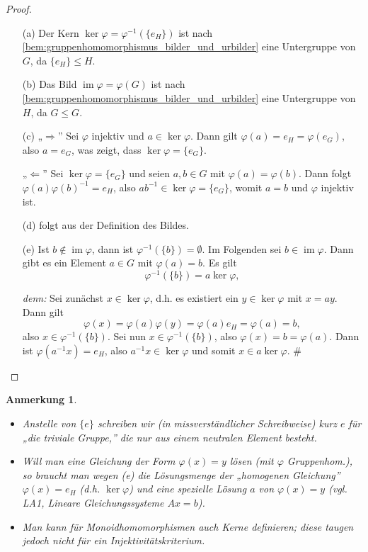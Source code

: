 \documentclass[a4paper, twoside, 11pt, ngerman]{report}
\DeclareMathOperator{\image}{im}
\theoremstyle{definistyle}
\newtheorem{anm}[satz]{Anmerkung}
\theoremstyle{remark}
\newenvironment{denn}%
  {\par\textit{denn:}}%
  {\hfill\#\par}
\begin{document}
\begin{proof}
\begin{itemize}
    \item[(a)] Der Kern $\ker \varphi = \varphi^{-1}(\{e_H\})$ ist nach \ref{bem:gruppenhomomorphismus_bilder_und_urbilder} eine Untergruppe von $G$, da $\{e_H\} \leq H$.
    
    \item[(b)] Das Bild $\image \varphi = \varphi(G)$ ist nach \ref{bem:gruppenhomomorphismus_bilder_und_urbilder} eine Untergruppe von $H$, da $G \leq G$.
    
    \item[(c)] „$\Rightarrow$” Sei $\varphi$ injektiv und $a \in \ker \varphi$. Dann gilt $\varphi(a) = e_H = \varphi(e_G)$, also $a = e_G$, was zeigt, dass $\ker \varphi = \{e_G\}$.

    „$\Leftarrow$” Sei $\ker \varphi = \{e_G\}$ und seien $a, b \in G$ mit $\varphi(a) = \varphi(b)$. Dann folgt $\varphi(a)\varphi(b)^{-1} = e_H$, also $ab^{-1} \in \ker \varphi = \{e_G\}$, womit $a = b$ und $\varphi$ injektiv ist.

    \item[(d)] folgt aus der Definition des Bildes.

    \item[(e)] Ist $b \notin \image \varphi$, dann ist $\varphi^{-1}(\{b\}) = \emptyset$.
Im Folgenden sei $b \in \image \varphi$. Dann gibt es ein Element $a \in G$ mit $\varphi(a) = b$. Es gilt
    \[
    \varphi^{-1}(\{b\}) = a \ker \varphi,
    \]
    \begin{denn}
    Sei zunächst $x \in \ker \varphi$, d.h. es existiert ein $y \in \ker \varphi$ mit $x = ay$. Dann gilt \[\varphi(x) = \varphi(a)\varphi(y) = \varphi(a)e_H = \varphi(a) = b,\]
    also $x \in \varphi^{-1}(\{b\})$.
    Sei nun $x \in \varphi^{-1}(\{b\})$, also $\varphi(x) = b = \varphi(a)$. Dann ist $\varphi(a^{-1} x) = e_H$, also $a^{-1} x \in \ker \varphi$ und somit $x \in a \ker \varphi$.
    \end{denn}
\end{itemize}
\end{proof}

\begin{anm}\label{anm:triviale_gruppe_schreibweise}
\begin{itemize}
    \item Anstelle von $\{e\}$ schreiben wir (in missverständlicher Schreibweise) kurz $e$ für „die triviale Gruppe,” die nur aus einem neutralen Element besteht.
    
    \item Will man eine Gleichung der Form $\varphi(x) = y$ lösen (mit $\varphi$ Gruppenhom.), so braucht man wegen (e) die Lösungsmenge der „homogenen Gleichung” $\varphi(x) = e_H$ (d.h. $\ker \varphi$) und eine spezielle Lösung $a$ von $\varphi(x) = y$ (vgl. LA1, Lineare Gleichungssysteme $Ax = b$).
    
    \item Man kann für Monoidhomomorphismen auch Kerne definieren; diese taugen jedoch nicht für ein Injektivitätskriterium.
\end{itemize}
\end{anm}
\end{document}
